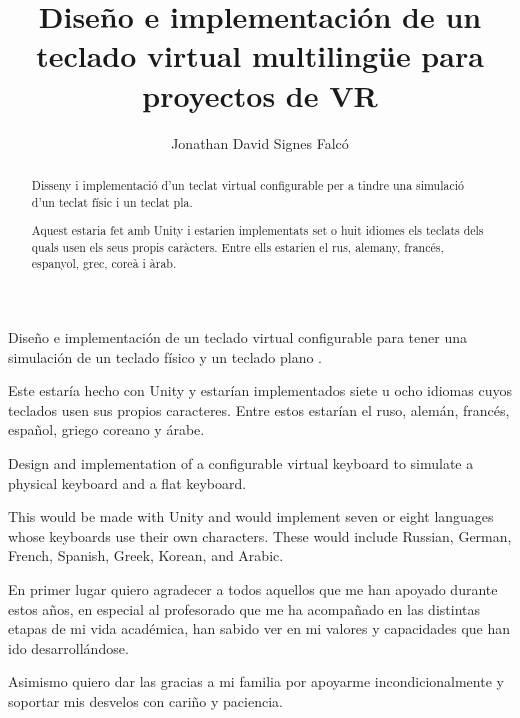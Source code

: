 \documentclass[twoside,spanish,a4paper,12pt]{tfg}
\title{Diseño e implementación de un teclado virtual multilingüe para proyectos de VR}
\author{Jonathan David Signes Falcó}
\begin{document}
	
	\portada
	\cleardoublepage
	\contraportada
	\cleardoublepage
	\declaracion
	\cleardoublepage
	
	
	\begin{resumen}
		Diseño e implementación de un teclado virtual configurable para tener una simulación de un teclado físico y un teclado plano .
		
		Este estaría hecho con Unity y estarían implementados siete u ocho idiomas cuyos teclados usen sus propios caracteres. Entre estos estarían el ruso, alemán, francés, español, griego coreano y árabe.
	\end{resumen}
	\cleardoublepage
	
	\begin{abstract}
		Disseny i implementació d'un teclat virtual configurable per a tindre una simulació d'un teclat físic i un teclat pla.
		
		Aquest estaria fet amb Unity i estarien implementats set o huit idiomes els teclats dels quals usen els seus propis caràcters. Entre ells estarien el rus, alemany, francés, espanyol, grec, coreà i àrab.
	\end{abstract}
	\cleardoublepage
	
	\begin{resum}
		Design and implementation of a configurable virtual keyboard to simulate a physical keyboard and a flat keyboard.
		
		This would be made with Unity and would implement seven or eight languages whose keyboards use their own characters. These would include Russian, German, French, Spanish, Greek, Korean, and Arabic.
	\end{resum}
	\cleardoublepage
	
	
	\begin{agradecimientos}
		En primer lugar quiero agradecer a todos aquellos que me han apoyado durante estos años, en especial al profesorado que me ha acompañado en las distintas etapas de mi vida académica, han sabido ver en mi valores y capacidades que han ido desarrollándose.
		
		Asimismo quiero dar las gracias a mi familia por apoyarme incondicionalmente y soportar mis desvelos con cariño y paciencia.
	\end{agradecimientos}
	\cleardoublepage
	
	\tableofcontents
	
\end{document}
